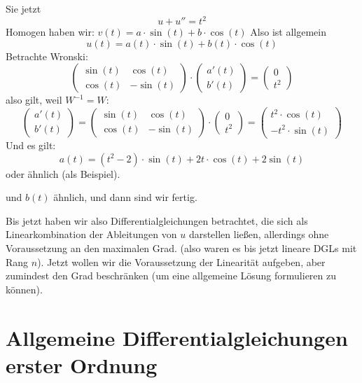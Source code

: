 \documentclass[main.tex]{subfiles}
\begin{document}
\begin{enumerate}
    \begin{Beispiel}
      Sie jetzt
      $$u + u'' = t^2$$
      Homogen haben wir: $v(t) = a \cdot \sin(t) + b \cdot \cos(t)$
      Also ist allgemein
      $$u(t) = a(t) \cdot \sin(t) + b(t) \cdot \cos(t)$$
      Betrachte Wronski:
      $$\begin{pmatrix}
        \sin(t) & \cos(t) \\ \cos(t) & -\sin(t)
      \end{pmatrix} \cdot \begin{pmatrix}
        a'(t) \\ b'(t)
      \end{pmatrix} = \begin{pmatrix}
        0 \\ t^2
      \end{pmatrix}$$
      also gilt, weil $W^{-1} = W$:
      $$\begin{pmatrix}
        a'(t) \\ b'(t)
      \end{pmatrix} = \begin{pmatrix}
        \sin(t) & \cos(t) \\ \cos(t) & -\sin(t)
      \end{pmatrix} \cdot \begin{pmatrix}
        0 \\ t^2
      \end{pmatrix} = \begin{pmatrix}
        t^2 \cdot \cos(t) \\ -t^2 \cdot \sin(t)
      \end{pmatrix}$$
      Und es gilt:
      $$a(t) = (t^2 - 2) \cdot \sin(t) + 2t \cdot \cos(t) + 2 \sin(t)$$
      oder ähnlich (als Beispiel).

      und $b(t)$ ähnlich, und dann sind wir fertig.
    \end{Beispiel}
\end{enumerate}


Bis jetzt haben wir also Differentialgleichungen betrachtet, die sich als Linearkombination der Ableitungen von $u$ darstellen ließen, allerdings ohne Voraussetzung an den maximalen Grad. (also waren es bis jetzt lineare DGLs mit Rang $n$). Jetzt wollen wir die Voraussetzung der Linearität aufgeben, aber zumindest den Grad beschränken (um eine allgemeine Lösung formulieren zu können).


\section{Allgemeine Differentialgleichungen erster Ordnung}
\end{document}
